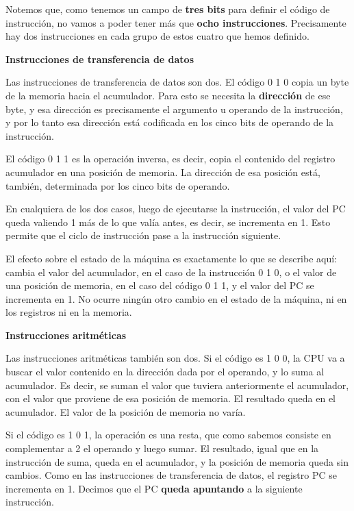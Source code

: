 \documentclass[spanish,A4,]{article}
\begin{document}
Notemos que, como tenemos un campo de \textbf{tres bits} para definir el
código de instrucción, no vamos a poder tener más que \textbf{ocho
instrucciones}. Precisamente hay dos instrucciones en cada grupo de
estos cuatro que hemos definido.

\textbf{Instrucciones de transferencia de datos}

Las instrucciones de transferencia de datos son dos. El código 0 1 0 copia
un byte de la memoria hacia el acumulador. Para esto se necesita la
\textbf{dirección} de ese byte, y esa dirección es precisamente el
argumento u operando de la instrucción, y por lo tanto esa dirección
está codificada en los cinco bits de operando de la instrucción.

El código 0 1 1 es la operación inversa, es decir, copia el contenido del
registro acumulador en una posición de memoria. La dirección de esa
posición está, también, determinada por los cinco bits de operando.

En cualquiera de los dos casos, luego de ejecutarse la instrucción, el
valor del PC queda valiendo 1 más de lo que valía antes, es decir, se
incrementa en 1. Esto permite que el ciclo de instrucción pase a la
instrucción siguiente.

El efecto sobre el estado de la máquina es exactamente lo que se
describe aquí: cambia el valor del acumulador, en el caso de la
instrucción 0 1 0, o el valor de una posición de memoria, en el caso del
código 0 1 1, y el valor del PC se incrementa en 1. No ocurre ningún otro
cambio en el estado de la máquina, ni en los registros ni en la memoria.

\textbf{Instrucciones aritméticas}

Las instrucciones aritméticas también son dos. Si el código es 1 0 0, la
CPU va a buscar el valor contenido en la dirección dada por el operando,
y lo suma al acumulador. Es decir, se suman el valor que tuviera
anteriormente el acumulador, con el valor que proviene de esa posición
de memoria. El resultado queda en el acumulador. El valor de la posición
de memoria no varía.

Si el código es 1 0 1, la operación es una resta, que como sabemos
consiste en complementar a 2 el operando y luego sumar. El resultado,
igual que en la instrucción de suma, queda en el acumulador, y la
posición de memoria queda sin cambios. Como en las instrucciones de
transferencia de datos, el registro PC se incrementa en 1. Decimos que
el PC \textbf{queda apuntando} a la siguiente instrucción.
\end{document}
